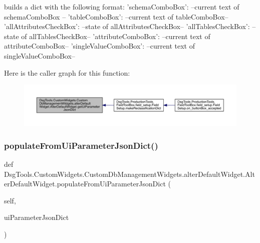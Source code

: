 \begin{DoxyVerb}builds a dict with the following format:
{
    'schemaComboBox': --current text of schemaComboBox --
    'tableComboBox': --current text of tableComboBox--
    'allAttributesCheckBox': --state of allAttributesCheckBox--
    'allTablesCheckBox': --state of allTablesCheckBox--
    'attributeComboBox': --current text of attributeComboBox--
    'singleValueComboBox': --current text of singleValueComboBox--
}
\end{DoxyVerb}
 Here is the caller graph for this function\+:
\nopagebreak
\begin{figure}[H]
\begin{center}
\leavevmode
\includegraphics[width=350pt]{class_dsg_tools_1_1_custom_widgets_1_1_custom_db_management_widgets_1_1alter_default_widget_1_1_alter_default_widget_aaa5f6dec82d55dd9df58afd969081705_icgraph}
\end{center}
\end{figure}
\mbox{\label{class_dsg_tools_1_1_custom_widgets_1_1_custom_db_management_widgets_1_1alter_default_widget_1_1_alter_default_widget_a8d32598b6af4e7befbc034fe38950a28}} 
\subsubsection{\texorpdfstring{populate\+From\+Ui\+Parameter\+Json\+Dict()}{populateFromUiParameterJsonDict()}}
{\footnotesize\ttfamily def Dsg\+Tools.\+Custom\+Widgets.\+Custom\+Db\+Management\+Widgets.\+alter\+Default\+Widget.\+Alter\+Default\+Widget.\+populate\+From\+Ui\+Parameter\+Json\+Dict (\begin{DoxyParamCaption}\item[{}]{self,  }\item[{}]{ui\+Parameter\+Json\+Dict }\end{DoxyParamCaption})}

